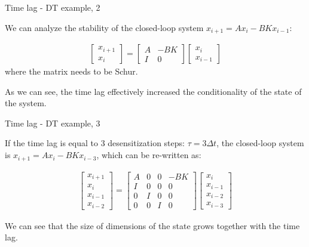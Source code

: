 \documentclass{beamer}
\begin{document}
\begin{frame}{Time lag - DT example, 2}
	\begin{flushleft}
		
		We can analyze the stability of the closed-loop system $x_{i+1} =A x_i - BKx_{i-1}$:
		
		\begin{align}
			\begin{bmatrix}
				x_{i+1} \\ x_i
			\end{bmatrix} = 
			\begin{bmatrix}
				A & -BK \\
				I & 0
			\end{bmatrix}
			\begin{bmatrix}
				x_i \\ x_{i-1}
			\end{bmatrix}
		\end{align}
		where the matrix needs to be Schur.
		
		\bigskip
		
		As we can see, the time lag effectively increased the conditionality of the state of the system.
		
	\end{flushleft}
\end{frame}



\begin{frame}{Time lag - DT example, 3}
	\begin{flushleft}
		
		If the time lag is equal to 3 desensitization steps: $\tau = 3 \Delta t$, the closed-loop system is $x_{i+1} =A x_i - BKx_{i-3}$, which can be re-written as:
		
		\begin{align}
			\begin{bmatrix}
				x_{i+1} \\ x_i \\ x_{i-1} \\ x_{i-2}
			\end{bmatrix} = 
			\begin{bmatrix}
				A & 0& 0& -BK \\
				I & 0 & 0 & 0\\
				0 & I & 0 & 0\\
				0 & 0 & I & 0
			\end{bmatrix}
			\begin{bmatrix}
				 x_i \\ x_{i-1} \\ x_{i-2} \\ x_{i-3}
			\end{bmatrix}
		\end{align}
		
		We can see that the size of dimensions of the state grows together with the time lag.
		
	\end{flushleft}
\end{frame}
\end{document}
